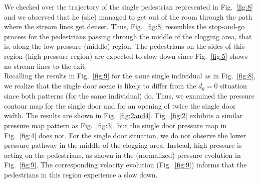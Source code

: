 





We checked over the trajectory of the single pedestrian represented in 
Fig.~\ref{fig:8} and we observed that he (she) managed to get out of the room 
through the path where the stream lines get denser. Thus, Fig.~\ref{fig:8} 
resembles the stop-and-go process for the pedestrians passing through the 
middle of the clogging area, that is, along the low pressure (middle)
region. The pedestrians on the sides of this region (high pressure region) are 
expected to slow down since Fig.~\ref{fig:5} shows no stream lines to the exit. 
\\

Recalling the results in Fig.~\ref{fig:9} for the same single individual as in 
Fig.~\ref{fig:8}, we realize that the single door scene is likely 
to differ from the $d_g=0$ situation since both patterns (for the same 
individual) do. Thus, we examined the pressure contour map for the single door 
and for an opening of twice the single door width. The results are shown in 
Fig.~\ref{fig:2and4}. Fig.~\ref{fig:2} exhibits a similar pressure map pattern 
as Fig.~\ref{fig:3}, but the single door pressure map in Fig.~\ref{fig:4} does 
not. For the single door situation, we do not observe the lower pressure 
pathway in the middle of the clogging area. Instead, high pressure 
is acting on the pedestrians, as shown in the (normalized) pressure evolution 
in Fig.~\ref{fig:9}. The corresponding velocity evolution (Fig.~\ref{fig:9}) 
informs that the pedestrians in this region experience a slow down. \\


